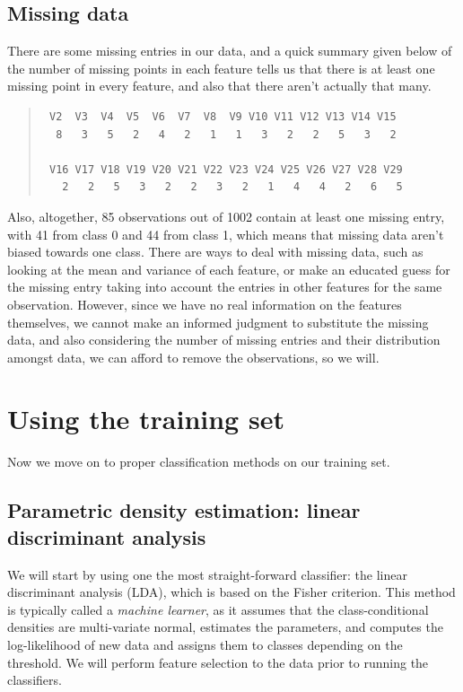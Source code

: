 \documentclass[11pt, a4paper]{article}
\begin{document}
\subsection{Missing data}
There are some missing entries in our data, and a quick summary given below of the number of missing points in each feature tells us that there is at least one missing point in every feature, and also that there aren't actually that many.

\begin{quote}
\begin{verbatim}
 V2  V3  V4  V5  V6  V7  V8  V9 V10 V11 V12 V13 V14 V15 
  8   3   5   2   4   2   1   1   3   2   2   5   3   2
  
 V16 V17 V18 V19 V20 V21 V22 V23 V24 V25 V26 V27 V28 V29
   2   2   5   3   2   2   3   2   1   4   4   2   6   5 
\end{verbatim}
\end{quote}

Also, altogether, 85 observations out of 1002 contain at least one missing entry, with 41 from class 0 and 44 from class 1, which means that missing data aren't biased towards one class. There are ways to deal with  missing data, such as looking at the mean and variance of each feature, or make an educated guess for the missing entry taking into account the entries in other features for the same observation. However, since we have no real information on the features themselves, we cannot make an informed judgment to substitute the missing data, and also considering the number of missing entries and their distribution amongst data, we can afford to remove the observations, so we will.

\section{Using the training set}

Now we move on to proper classification methods on our training set.

\subsection{Parametric density estimation: linear discriminant analysis}
We will start by using one the most straight-forward classifier: the linear discriminant analysis (LDA), which is based on the Fisher criterion. This method is typically called a \emph{machine learner}, as it assumes that the class-conditional densities are multi-variate normal, estimates the parameters, and computes the log-likelihood of new data and assigns them to classes depending on the threshold. We will perform feature selection to the data prior to running the classifiers.
\end{document}
